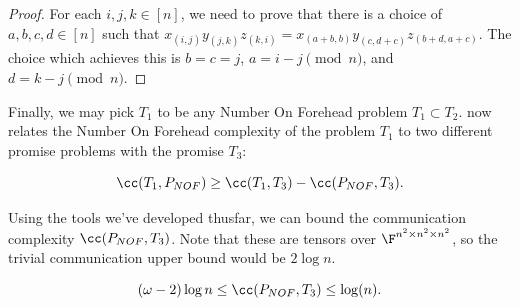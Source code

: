 \begin{proof}
For each $i,j,k \in [n]$, we need to prove that there is a choice of $a,b,c,d \in [n]$ such that $x_{(i,j)} y_{(j,k)} z_{(k,i)} = x_{(a+b,b)} y_{(c,d+c)} z_{(b+d, a+c)}$. The choice which achieves this is $b=c=j$, $a = i-j \pmod{n}$, and $d=k-j \pmod{n}$.
\end{proof}

Finally, we may pick $T_1$ to be any Number On Forehead problem $T_1 \subset T_2$.  now relates the Number On Forehead complexity of the problem $T_1$ to two different promise problems with the promise $T_3$:

$$\cc(T_1, P_{NOF}) \geq \cc(T_1, T_3) - \cc(P_{NOF}, T_3).$$

Using the tools we've developed thusfar, we can bound the communication complexity $\cc(P_{NOF}, T_3)$. Note that these are tensors over $\F^{n^2 \times n^2 \times n^2}$, so the trivial communication upper bound would be $2 \log n$.

\begin{lemma} \label{lem:NOFingroup}
    $$(\omega - 2) \log n \leq \cc(P_{NOF}, T_3) \leq \log(n).$$
\end{lemma}

